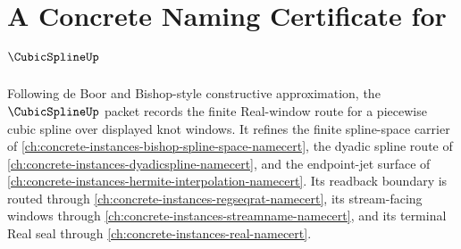 \chapter{A Concrete Naming Certificate for $\CubicSplineUp$}
\label{ch:concrete-instances-cubic-spline-namecert}

Following de Boor and Bishop-style constructive approximation, the $\CubicSplineUp$ packet records the finite Real-window route for a piecewise cubic spline over displayed knot windows. It refines the finite spline-space carrier of \autoref{ch:concrete-instances-bishop-spline-space-namecert}, the dyadic spline route of \autoref{ch:concrete-instances-dyadicspline-namecert}, and the endpoint-jet surface of \autoref{ch:concrete-instances-hermite-interpolation-namecert}. Its readback boundary is routed through \autoref{ch:concrete-instances-regseqrat-namecert}, its stream-facing windows through \autoref{ch:concrete-instances-streamname-namecert}, and its terminal Real seal through \autoref{ch:concrete-instances-real-namecert}.

